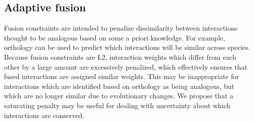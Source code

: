 \documentclass[11pt]{article}
\begin{document}

\subsection{Adaptive fusion}
Fusion constraints are intended to penalize dissimilarity between interactions thought to be analogous based on some a priori knowledge. For example, orthology can be used to predict which interactions will be similar across species. Because fusion constraints are L2, interaction weights which differ from each other by a large amount are excessively penalized, which effectively ensures that fused interactions are assigned similar weights. This may be inappropriate for interactions which are identified based on orthology as being analogous, but which are no longer similar due to evolutionary changes. We propose that a saturating penalty may be useful for dealing with uncertainty about which interactions are conserved. 
\end{document}
